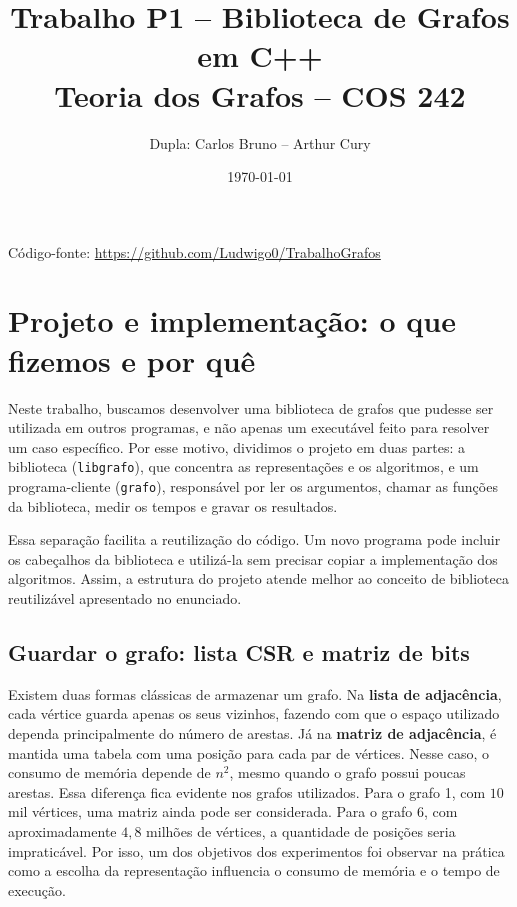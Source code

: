 \documentclass[11pt,a4paper]{article}
\title{Trabalho P1 -- Biblioteca de Grafos em C++ \\ \small Teoria dos Grafos -- COS 242}
\author{Dupla: Carlos Bruno -- Arthur Cury}
\date{\today}
\begin{document}
\maketitle

\noindent C\'odigo-fonte: \url{https://github.com/Ludwigo0/TrabalhoGrafos}

\section{Projeto e implementa\c c\~ao: o que fizemos e por qu\^e}

Neste trabalho, buscamos desenvolver uma biblioteca de grafos que pudesse ser utilizada
em outros programas, e n\~ao apenas um execut\'avel feito para resolver um caso
espec\'ifico. Por esse motivo, dividimos o projeto em duas partes: a biblioteca
(\texttt{libgrafo}), que concentra as representa\c c\~oes e os algoritmos, e um
programa-cliente (\texttt{grafo}), respons\'avel por ler os argumentos, chamar as
fun\c c\~oes da biblioteca, medir os tempos e gravar os resultados.

Essa separa\c c\~ao facilita a reutiliza\c c\~ao do c\'odigo. Um novo programa pode
incluir os cabe\c calhos da biblioteca e utiliz\'a-la sem precisar copiar a implementa\c c\~ao
dos algoritmos. Assim, a estrutura do projeto atende melhor ao conceito de biblioteca
reutiliz\'avel apresentado no enunciado.

\subsection{Guardar o grafo: lista CSR e matriz de bits}

Existem duas formas cl\'assicas de armazenar um grafo. Na \textbf{lista de adjac\^encia},
cada v\'ertice guarda apenas os seus vizinhos, fazendo com que o espa\c co utilizado
dependa principalmente do n\'umero de arestas. J\'a na \textbf{matriz de adjac\^encia},
\'e mantida uma tabela com uma posi\c c\~ao para cada par de v\'ertices. Nesse caso, o
consumo de mem\'oria depende de $n^2$, mesmo quando o grafo possui poucas arestas.
Essa diferen\c ca fica evidente nos grafos utilizados. Para o grafo 1, com $10$ mil
v\'ertices, uma matriz ainda pode ser considerada. Para o grafo 6, com aproximadamente
$4,8$ milh\~oes de v\'ertices, a quantidade de posi\c c\~oes seria impratic\'avel. Por
isso, um dos objetivos dos experimentos foi observar na pr\'atica como a escolha da
representa\c c\~ao influencia o consumo de mem\'oria e o tempo de execu\c c\~ao.
\end{document}
